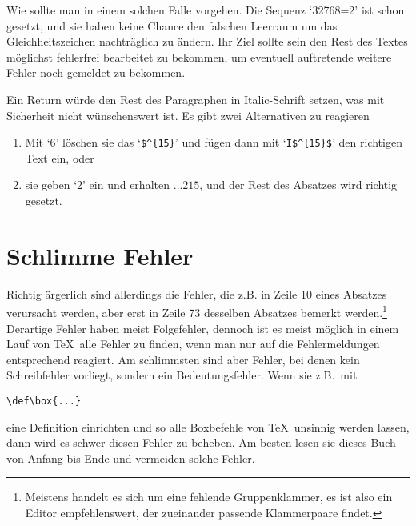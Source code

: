 Wie sollte man in einem solchen Falle vorgehen. Die Sequenz `32768=2'
ist schon gesetzt, und sie haben keine Chance den falschen Leerraum um
das Gleichheitszeichen nachtr\"aglich zu \"andern. Ihr Ziel sollte sein
den Rest des Textes m\"oglichst fehlerfrei bearbeitet zu bekommen, um
eventuell auftretende weitere Fehler noch gemeldet zu bekommen.

Ein Return w\"urde den Rest des Paragraphen in 
Italic-Schrift setzen,
was mit Sicherheit nicht w\"unschenswert ist. Es gibt zwei Alternativen
zu reagieren
\begin{enumerate}
\item Mit `6' l\"oschen sie das `\verb|$^{15}|' und f\"ugen dann mit
`\verb|I$^{15}$|' den richtigen Text ein, oder
\item sie geben `2' ein und erhalten $\ldots215$, und der Rest des
Absatzes wird richtig gesetzt.
\end{enumerate}

\section{Schlimme Fehler}
Richtig \"argerlich sind allerdings die Fehler, die z.B. in Zeile 10
eines 
Absatzes verursacht werden, aber erst in Zeile 73 desselben
Absatzes bemerkt werden.\footnote{Meistens handelt es sich um eine
fehlende Gruppenklammer, es ist also ein 
Editor empfehlenswert, der
zueinander passende Klammerpaare findet.} Derartige Fehler haben meist
Folgefehler, dennoch ist es meist m\"oglich in einem Lauf von \TeX\ alle
Fehler zu finden, wenn man nur auf die Fehlermeldungen entsprechend
reagiert. Am schlimmsten sind aber Fehler, bei denen kein
Schreibfehler vorliegt, sondern ein Bedeutungsfehler. Wenn sie z.B.\
mit
\begin{verbatim}
\def\box{...}
\end{verbatim}
eine Definition einrichten und so alle Boxbefehle von \TeX\ unsinnig
werden lassen, dann wird es schwer diesen Fehler zu beheben. Am besten
lesen sie dieses Buch von Anfang bis Ende und vermeiden solche Fehler.


